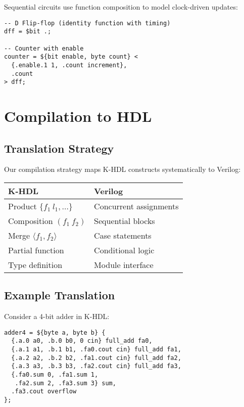 \documentclass[10pt,twocolumn]{article}
\begin{document}
Sequential circuits use function composition to model clock-driven updates:

\begin{lstlisting}
-- D Flip-flop (identity function with timing)
dff = $bit .;

-- Counter with enable
counter = ${bit enable, byte count} <
  {.enable.1 1, .count increment},
  .count
> dff;
\end{lstlisting}

\section{Compilation to HDL}

\subsection{Translation Strategy}

Our compilation strategy maps K-HDL constructs systematically to Verilog:

\begin{center}
\begin{tabular}{l|l}
\textbf{K-HDL} & \textbf{Verilog} \\
\hline
Product $\{f_1\ l_1, \ldots\}$ & Concurrent assignments \\
Composition $(f_1\ f_2)$ & Sequential blocks \\
Merge $\langle f_1, f_2 \rangle$ & Case statements \\
Partial function & Conditional logic \\
Type definition & Module interface \\
\end{tabular}
\end{center}

\subsection{Example Translation}

Consider a 4-bit adder in K-HDL:

\begin{lstlisting}
adder4 = ${byte a, byte b} {
  {.a.0 a0, .b.0 b0, 0 cin} full_add fa0,
  {.a.1 a1, .b.1 b1, .fa0.cout cin} full_add fa1,
  {.a.2 a2, .b.2 b2, .fa1.cout cin} full_add fa2,
  {.a.3 a3, .b.3 b3, .fa2.cout cin} full_add fa3,
  {.fa0.sum 0, .fa1.sum 1, 
   .fa2.sum 2, .fa3.sum 3} sum,
  .fa3.cout overflow
};
\end{lstlisting}
\end{document}

